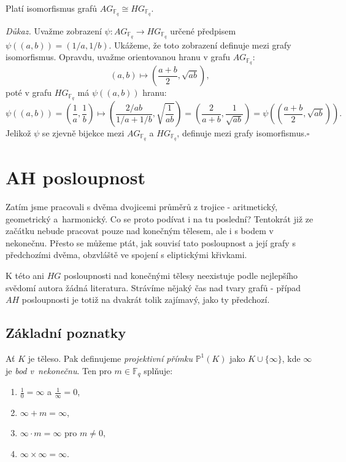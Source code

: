 \documentclass[12pt]{report}
\begin{document}
\begin{veta}
Platí isomorfismus grafů $AG_{\mathbb{F}_q} \cong HG_{\mathbb{F}_q}$.
\end{veta}
\noindent \textit{Důkaz.} Uvažme zobrazení $\psi : AG_{\mathbb{F}_q} \longrightarrow HG_{\mathbb{F}_q}$ určené předpisem $\psi((a,b)) = (1/a,1/b)$. Ukážeme, že toto zobrazení definuje mezi grafy isomorfismus. Opravdu, uvažme orientovanou hranu v grafu $AG_{\mathbb{F}_q}$: 
$$(a,b) \longmapsto \left(\frac{a+b}{2}, \sqrt{ab} \right),$$
poté v grafu $HG_{\mathbb{F}_q}$ má $\psi((a,b))$ hranu:
$$\psi ((a,b)) = \left(\frac{1}{a}, \frac{1}{b} \right) \longmapsto \left(\frac{2/ab}{1/a+1/b}, \sqrt{\frac{1}{ab}} \right) = \left( \frac{2}{a+b}, \frac{1}{\sqrt{ab}} \right) = \psi \left( \left( \frac{a+b}{2}, \sqrt{ab} \right) \right).$$
Jelikož $\psi$ se zjevně bijekce mezi $AG_{\mathbb{F}_q}$ a $HG_{\mathbb{F}_q}$, definuje mezi grafy isomorfismus.\hfill $\square$\\


\chapter{AH posloupnost}\label{AH}
Zatím jsme pracovali s dvěma dvojicemi průměrů z trojice - aritmetický, geometrický a~harmonický. Co se proto podívat i na tu poslední? Tentokrát již ze začátku nebude pracovat pouze nad konečným tělesem, ale i s bodem v nekonečnu. Přesto se můžeme ptát, jak souvisí tato posloupnost a její grafy s předchozími dvěma, obzvláště ve spojení s eliptickými křivkami.

K této ani $HG$ posloupnosti nad konečnými tělesy neexistuje podle nejlepšího svědomí autora žádná literatura. Strávíme nějaký čas nad tvary grafů - případ $AH$ posloupnosti je totiž na dvakrát tolik zajímavý, jako ty předchozí.

\section{Základní poznatky}



\begin{definice}
Ať $K$ je těleso. Pak definujeme \textit{projektivní přímku} $\mathbb{P}^{1} (K)$ jako $K \cup \lbrace \infty \rbrace$, kde $\infty$ je \textit{bod v~nekonečnu}. Ten pro $m \in \mathbb{F}_q$ splňuje:
\begin{enumerate}
\item $\frac{1}{0} = \infty$ a $\frac{1}{\infty} = 0$,
\item $\infty+m = \infty$,
\item $\infty \cdot m = \infty$ pro $m \neq 0$,
\item $\infty \times \infty = \infty$.
\end{enumerate}
\end{definice}
\end{document}
